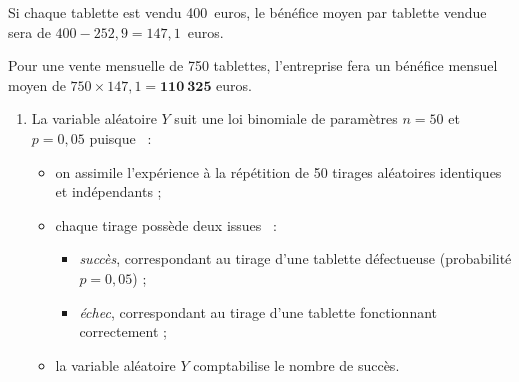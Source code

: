 \begin{corrige}
\begin{enumerate}
          \par
          Si chaque tablette est vendu 400~euros, le bénéfice moyen par tablette vendue sera de $400 - 252,9 = 147,1$~euros.
          \par
          Pour une vente mensuelle de 750 tablettes, l'entreprise fera un bénéfice mensuel moyen de $750 \times 147,1 =\bm{110\ 325}$ euros.
          \par
     \end{enumerate}
     \par
     \par
     \begin{enumerate}
          \par
          \item %
          \par
          La variable aléatoire $Y$ suit une loi binomiale de paramètres $n=50$ et $p=0,05$ puisque ~:
          \par
          \begin{itemize}
               \par
               \item on assimile l'expérience à la répétition de 50 tirages aléatoires identiques et indépendants ;
               \par
               \item chaque tirage possède deux issues ~:
               \par
               \begin{itemize}
                    \par
                    \item \textit{succès}, correspondant au tirage d'une tablette défectueuse (probabilité $p=0,05$) ;
                    \item \textit{échec}, correspondant au tirage d'une tablette fonctionnant correctement ;
                    \par
               \end{itemize}
               \par
               \item la variable aléatoire $Y$ comptabilise le nombre de succès.
               \par

\end{itemize}
\end{enumerate}
\end{corrige}
